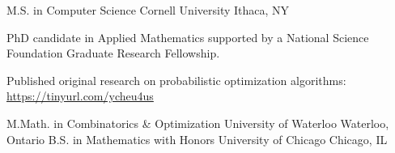 

\begin{cventries}

  \cventry
    {M.S. in Computer Science} %
    {Cornell University} %
    {Ithaca, NY} %
    {} %
    {
      \begin{cvitems} %
        \item {PhD candidate in Applied Mathematics supported by a National Science Foundation Graduate Research Fellowship.}
        \item {Published original research on probabilistic optimization algorithms: \url{https://tinyurl.com/ycheu4us}}
      \end{cvitems}
    }

  \cventry
    {M.Math. in Combinatorics \& Optimization} %
    {University of Waterloo} %
    {Waterloo, Ontario} %
    {} %
    {}
  \vspace{-1.0mm}
  \cventry
    {B.S. in Mathematics with Honors} %
    {University of Chicago} %
    {Chicago, IL} %
    {} %
    {}
  \vspace{-1.0mm}
\end{cventries}

